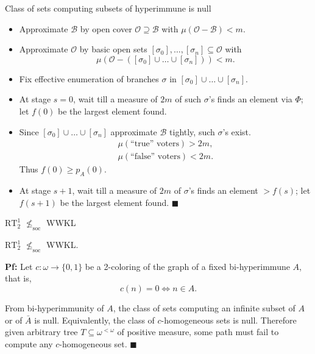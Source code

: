 \begin{frame}{Class of sets computing subsets of hyperimmune is null}
  \begin{itemize}
    \item Approximate $\mathcal{B}$ by open cover
      $\mathcal{O}\supseteq\mathcal{B}$ with
      $\mu(\mathcal{O}-\mathcal{B})<m$.
    \item Approximate $\mathcal{O}$ by basic open sets
      $[\sigma_0],\ldots,[\sigma_n] \subseteq\mathcal{O}$ with
      \[\mu(\mathcal{O}-([\sigma_0]\cup\ldots\cup[\sigma_n])) <m.\]
    \item Fix effective enumeration of branches $\sigma$ in
      $[\sigma_0]\cup\ldots\cup[\sigma_n]$.
    \item At stage $s=0$, wait till a measure of $2m$ of such $\sigma$'s
      finds an element via $\Phi$; let $f(0)$ be the largest element found.
    \item Since $[\sigma_0]\cup\ldots\cup[\sigma_n]$ approximate
      $\mathcal{B}$ tightly, such $\sigma$'s exist.
      \begin{align*}
        \mu(\text{``true'' voters})>2m,\\
        \mu(\text{``false'' voters})<2m.
      \end{align*}
      Thus $f(0)\geq p_A(0)$.
    \item At stage $s+1$, wait till a measure of $2m$ of $\sigma$'s
      finds an element $>f(s)$; let $f(s+1)$ be the largest
      element found. $\blacksquare$
  \end{itemize}
\end{frame}

\begin{frame}{$\text{RT}_2^1$ $\nleq_{\text{soc}}$ WWKL}
  \begin{thm}
    $\text{RT}_2^1$ $\nleq_{\text{soc}}$ WWKL.
  \end{thm}

  \vspace{1em}
  \textbf{Pf:} Let $c:\omega\rightarrow\{0,1\}$ be a 2-coloring of the
  graph of a fixed bi-hyperimmune $A$, that is,
  \[c(n)=0 \Leftrightarrow n\in A.\]
  
  From bi-hyperimmunity of $A$, the class of sets computing an infinite
  subset of $A$ or of $\bar{A}$ is null. Equivalently, the class of
  $c$-homogeneous sets is null. Therefore given arbitrary tree
  $T\subseteq\omega^{<\omega}$ of positive measure, some path must fail to
  compute any $c$-homogeneous set. $\blacksquare$
\end{frame}


